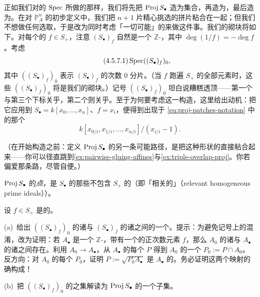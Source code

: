正如我们对\trRing{}的 $\operatorname{Spec}$ 所做的那样，我们将先把 $\operatorname{Proj} S_\bullet$ 造为集合，再造为\trTopologicalSpace，最后造为\trRingedSpace。在对 $\mathbb{P}^n_A$ 的初步定义中，我们把 $n+1$ 片精心挑选的\trAffine{}拼片粘合在一起；但我们不想做任何选取，于是改为同时考虑「一切可能」的\trAffine\trOpenSet{}来做这件事。我们的\trAffine{}砌块将如下。对每个\trHomogeneous{}的 $f\in S_+$，注意\trLocalization{} $(S_\bullet)_f$ 自然是一个 $\mathbb{Z}$-\trGradedRing，其中 $\deg(1/f)=-\deg f$。考虑
\begin{equation*}\tag{4.5.7.1}\label{eq:spec-localized-zero-graded}
\operatorname{Spec}((S_\bullet)_f)_0,
\end{equation*}
其中 $((S_\bullet)_f)_0$ 表示\trGradedRing{} $(S_\bullet)_f$ 的次数 $0$ 分片。（当 $f$ 跑遍 $S_+$ 的全部\trHomogeneous{}元素时，这些 $((S_\bullet)_f)_0$ 将是我们的\trAffine{}砌块。）记号 $((S_\bullet)_f)_0$ 坦白说糟糕透顶——第一个与第三个下标关乎\trGrading，第二个则关乎\trLocalization。至于为何要考虑这一构造，这里给出动机：把它应用到 $S_\bullet=k[x_0,\dots,x_n]$、$f=x_i$，便得到出现于 \eqref{eq:proj-patches-notation} 中的那个\trRing
\[
k[x_{0/i},x_{1/i},\dots,x_{n/i}]/(x_{i/i}-1).
\]

（在开始构造之前：定义 $\operatorname{Proj} S_\bullet$ 的另一条可能路径，是把这种形状的\trAffineScheme{}直接粘合起来——你可以径直跳到\cref{ex:pairwise-gluing-affines}与\cref{ex:triple-overlap-proj}。你若偏爱那条路，尽管自便。）

$\operatorname{Proj} S_\bullet$ 的\emph{点}，是 $S_\bullet$ 的那些不包含\trIrrelevantIdeal{} $S_+$ 的\trHomogeneous\trPrimeIdeal（即「相关的\trHomogeneous\trPrimeIdeal」（relevant homogeneous prime ideals））。

\begin{exercise}[重要而棘手的练习]\label{ex:zero-piece-prime-bijection}
设 $f\in S_+$ 是\trHomogeneous{}的。

(a)~给出 $((S_\bullet)_f)_0$ 的诸\trPrimeIdeal{}与 $(S_\bullet)_f$ 的诸\trHomogeneous\trPrimeIdeal{}之间的一个\trBijection。提示：为避免记号上的混淆，改为证明：若 $A_\bullet$ 是一个 $\mathbb{Z}$-\trGradedRing，带有一个\trInvertible{}的正次数\trHomogeneous{}元素 $f$，那么 $A_0$ 的诸\trPrimeIdeal{}与 $A_\bullet$ 的诸\trHomogeneous\trPrimeIdeal{}之间存在\trBijection。利用\trRingMorphism{} $A_0\to A_\bullet$，从 $A_\bullet$ 的每个\trHomogeneous\trPrimeIdeal{} $P$ 得到 $A_0$ 的一个\trPrimeIdeal{} $P_0:=P\cap A_0$。反方向：对 $A_0$ 的每个\trPrimeIdeal{} $P_0$，证明 $P:=\sqrt{P_0A_\bullet}$ 是 $A_\bullet$ 的\trPrimeIdeal。务必证明这两个映射的确构成\trBijection！

(b)~把 $((S_\bullet)_f)_0$ 的\trPrimeIdeal{}之集解读为 $\operatorname{Proj} S_\bullet$ 的一个子集。
\end{exercise}

